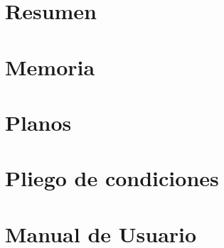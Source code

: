%
%








\clearemptydoublepage




\clearemptydoublepage

\tableofcontents
\listoffigures
\listoftables
\setlength{\parskip}{2mm}

\newpage
\newpage

\clearemptydoublepage
\chapter{Resumen}
\newpage
\clearemptydoublepage

\clearemptydoublepage

\chapter{Memoria}
\newpage
\clearemptydoublepage

\clearemptydoublepage

\chapter{Planos}
\newpage
\clearemptydoublepage

\clearemptydoublepage

\chapter{Pliego de condiciones}
\newpage
\clearemptydoublepage

\clearemptydoublepage

% 

\chapter{Manual de Usuario}
\newpage
\clearemptydoublepage

\clearemptydoublepage

% 

